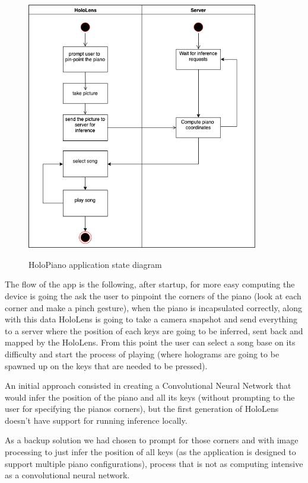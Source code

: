 \documentclass[12 pct]{report}
\begin{document}
\begin{figure}[H]
\includegraphics[width=0.9\textwidth]{HoloPianoStateDiagram}
\centering
\label{fig:feature-points}
\caption{HoloPiano application state diagram}
\end{figure}

The flow of the app is the following, after startup, for more easy computing the device is going the ask the user to pinpoint the corners of the piano (look at each corner and make a pinch gesture), when the piano is incapsulated correctly, along with this data HoloLens is going to take a camera snapshot and send everything to a server where the position of each keys are going to be inferred, sent back and mapped by the HoloLens. From this point the user can select a song base on its difficulty and start the process of playing (where holograms are going to be spawned up on the keys that are needed to be pressed).

An initial approach consisted in creating a Convolutional Neural Network that would infer the position of the piano and all its keys (without prompting to the user for specifying the pianos corners), but the first generation of HoloLens doesn't have support for running inference locally.

As a backup solution we had chosen to prompt for those corners and with image processing to just infer the position of all keys (as the application is designed to support multiple piano configurations), process that is not as computing intensive as a convolutional neural network.
\end{document}
